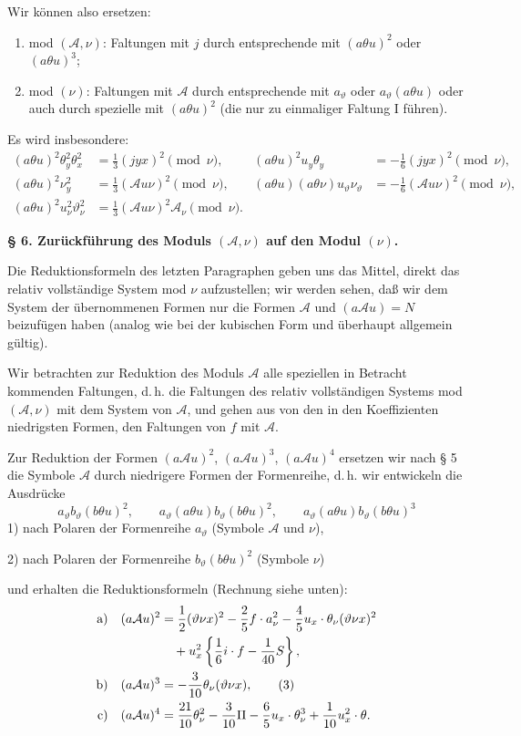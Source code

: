 \documentclass[11pt]{article}
\newcommand{\A}{\mathcal A}
\begin{document}
Wir können also ersetzen:
\begin{enumerate}
\item mod $(\A,\nu)$: Faltungen mit $j$ durch entsprechende mit $(a\theta u)^2$ oder $(a\theta u)^3$;
\item mod $(\nu)$: Faltungen mit $\A$ durch entsprechende mit $a_\vartheta$ oder $a_\vartheta(a\theta u)$ oder auch durch spezielle mit $(a\theta u)^2$ (die nur zu einmaliger Faltung I führen).
\end{enumerate}
Es wird insbesondere:
\[
\begin{aligned}
(a\theta u)^2\theta_y^2\theta_x^2&=\frac13(jyx)^2\pmod{\nu},&
(a\theta u)^2u_y\theta_y&=-\frac16(jyx)^2\pmod{\nu},\\
(a\theta u)^2\nu_y^2&=\frac13(\A u\nu)^2\pmod{\nu},&
(a\theta u)(a\theta\nu)u_\vartheta\nu_\vartheta&=-\frac16(\A u\nu)^2\pmod{\nu},\\
(a\theta u)^2u_\nu^2\vartheta_\nu^2&=\frac13(\A u\nu)^2\A_\nu\pmod{\nu}.
\end{aligned}
\]

\begin{center}
\textbf{§ 6. \quad Zurückführung des Moduls $(\A,\nu)$ auf den Modul $(\nu)$.}
\end{center}

Die Reduktionsformeln des letzten Paragraphen geben uns das Mittel, direkt das relativ vollständige System mod $\nu$ aufzustellen; wir werden sehen, daß wir dem System der übernommenen Formen nur die Formen $\A$ und $(a\A u)=N$ beizufügen haben (analog wie bei der kubischen Form und überhaupt allgemein gültig).

Wir betrachten zur Reduktion des Moduls $\A$ alle speziellen in Betracht kommenden Faltungen, d.\,h. die Faltungen des relativ vollständigen Systems mod $(\A,\nu)$ mit dem System von $\A$, und gehen aus von den in den Koeffizienten niedrigsten Formen, den Faltungen von $f$ mit $\A$.

Zur Reduktion der Formen $(a\A u)^2$, $(a\A u)^3$, $(a\A u)^4$ ersetzen wir nach § 5 die Symbole $\A$ durch niedrigere Formen der Formenreihe, d.\,h. wir entwickeln die Ausdrücke
\[
a_\vartheta b_\vartheta(b\theta u)^2,\qquad
a_\vartheta(a\theta u)b_\vartheta(b\theta u)^2,\qquad
a_\vartheta(a\theta u)b_\vartheta(b\theta u)^3
\]
1) nach Polaren der Formenreihe $a_\vartheta$ (Symbole $\A$ und $\nu$),

2) nach Polaren der Formenreihe $b_\vartheta(b\theta u)^2$ (Symbole $\nu$)

und erhalten die Reduktionsformeln (Rechnung siehe unten):
\begin{align}
\text{a)}\quad (a\A u)^2
&=\frac12(\vartheta\nu x)^2-\frac25 f\cdot a_\nu^2
-\frac45u_x\cdot\theta_\nu(\vartheta\nu x)^2 \notag\\
&\quad+u_x^2\left\{\frac16 i\cdot f-\frac1{40}S\right\},\notag\\
\text{b)}\quad (a\A u)^3
&=-\frac3{10}\theta_\nu(\vartheta\nu x),\tag{3}\\
\text{c)}\quad (a\A u)^4
&=\frac{21}{10}\theta_\nu^2-\frac3{10}\Pi
-\frac65u_x\cdot\theta_\nu^3+\frac1{10}u_x^2\cdot\theta .\notag
\end{align}
\end{document}
